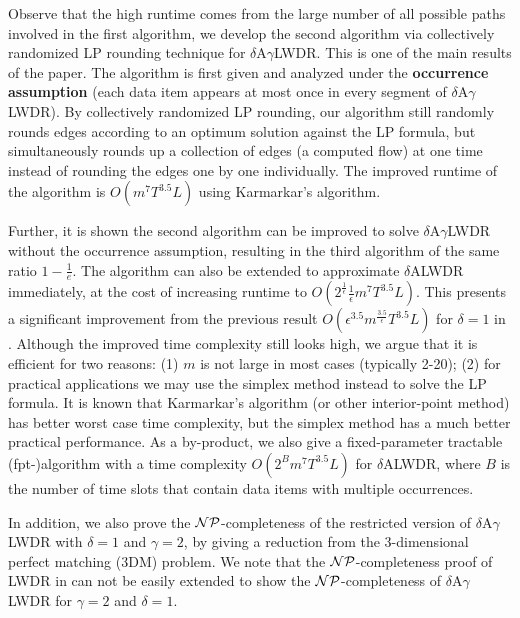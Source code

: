 \documentclass[11pt,english,onecolumn,draftcls]{IEEEtran}
\theoremstyle{plain}
\theoremstyle{plain}
\theoremstyle{plain}
\theoremstyle{plain}
\begin{document}
Observe that the high runtime comes from the large number of all possible
paths involved in the first algorithm, we develop the second algorithm
via collectively randomized LP rounding technique for $\delta$A$\gamma$LWDR.
This is one of the main results of the paper. The algorithm is first
given and analyzed under the \textbf{occurrence assumption} (each
data item appears at most once in every segment of $\delta$A$\gamma$LWDR).
By collectively randomized LP rounding, our algorithm still randomly
rounds edges according to an optimum solution against the LP formula,
but simultaneously rounds up a collection of edges (a computed flow)
at one time instead of rounding the edges one by one individually.
The improved runtime of the algorithm is $O(m^{7}T^{3.5}L)$ using
Karmarkar's algorithm.\textbf{ }

Further, it is shown the second algorithm can be improved to solve
$\delta$A$\gamma$LWDR without the occurrence assumption, resulting
in the third algorithm of the same ratio $1-\frac{1}{e}$. The algorithm
can also be extended to approximate $\delta$ALWDR immediately, at
the cost of increasing runtime to $O(2^{\frac{1}{\epsilon}}\frac{1}{\epsilon}m^{7}T^{3.5}L)$.
This presents a significant improvement from the previous result $O(\epsilon^{3.5}m^{\frac{3.5}{\epsilon}}T^{3.5}L)$
for $\delta=1$ in \cite{lu2014data}. Although the improved time
complexity still looks high, we argue that it is efficient for two
reasons: (1) $m$ is not large in most cases (typically 2-20); (2)
for practical applications we may use the simplex method instead to
solve the LP formula. It is known that Karmarkar's algorithm (or other
interior-point method) has better worst case time complexity, but
the simplex method has a much better practical performance. As a by-product,
we also give a fixed-parameter tractable (fpt-)algorithm with a time
complexity $O(2^{B}m^{7}T^{3.5}L)$ for $\delta$ALWDR, where $B$
is the number of time slots that contain data items with multiple
occurrences.

In addition, we also prove the ${\cal NP}$-completeness of the restricted
version of $\delta$A$\gamma$LWDR with $\delta=1$ and $\gamma=2$,
by giving a reduction from the 3-dimensional perfect matching (3DM)
problem. We note that the ${\cal NP}$-completeness proof of LWDR
in \cite{Infocom12LuEfficient} can not be easily extended to show
the ${\cal NP}$-completeness of $\delta$A$\gamma$LWDR for $\gamma=2$
and $\delta=1$.
\end{document}
